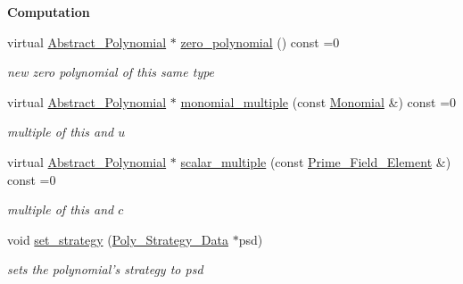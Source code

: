 \begin{Indent}\textbf{ Computation}\par
\begin{DoxyCompactItemize}
\item 
\mbox{\label{group__polygroup_ab50acaac5654329c0299d5694a25b1ed}} 
virtual \hyperlink{group__polygroup_class_abstract___polynomial}{Abstract\+\_\+\+Polynomial} $\ast$ \hyperlink{group__polygroup_ab50acaac5654329c0299d5694a25b1ed}{zero\+\_\+polynomial} () const =0
\begin{DoxyCompactList}\small\item\em new zero polynomial of this same type \end{DoxyCompactList}\item 
\mbox{\label{group__polygroup_aacee94ef63116201c91c7d65779097d8}} 
virtual \hyperlink{group__polygroup_class_abstract___polynomial}{Abstract\+\_\+\+Polynomial} $\ast$ \hyperlink{group__polygroup_aacee94ef63116201c91c7d65779097d8}{monomial\+\_\+multiple} (const \hyperlink{group__polygroup_class_monomial}{Monomial} \&) const =0
\begin{DoxyCompactList}\small\item\em multiple of this and $u$ \end{DoxyCompactList}\item 
\mbox{\label{group__polygroup_a53b0ed425ff4bbbf01818005d6003d59}} 
virtual \hyperlink{group__polygroup_class_abstract___polynomial}{Abstract\+\_\+\+Polynomial} $\ast$ \hyperlink{group__polygroup_a53b0ed425ff4bbbf01818005d6003d59}{scalar\+\_\+multiple} (const \hyperlink{group___fields_group_class_prime___field___element}{Prime\+\_\+\+Field\+\_\+\+Element} \&) const =0
\begin{DoxyCompactList}\small\item\em multiple of this and $c$ \end{DoxyCompactList}\item 
\mbox{\label{group__polygroup_a780b8c4b18ae1df16ce680f79d9ace7b}} 
void \hyperlink{group__polygroup_a780b8c4b18ae1df16ce680f79d9ace7b}{set\+\_\+strategy} (\hyperlink{group__strategygroup_class_poly___strategy___data}{Poly\+\_\+\+Strategy\+\_\+\+Data} $\ast$psd)
\begin{DoxyCompactList}\small\item\em sets the polynomial's strategy to {\ttfamily psd} \end{DoxyCompactList}\end{DoxyCompactItemize}
\end{Indent}
